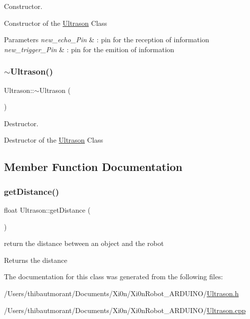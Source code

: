 Constructor. 

Constructor of the \hyperlink{class_ultrason}{Ultrason} Class\textquotesingle{}


\begin{DoxyParams}{Parameters}
{\em new\+\_\+echo\+\_\+\+Pin} & \+: pin for the reception of information \\
\hline
{\em new\+\_\+trigger\+\_\+\+Pin} & \+: pin for the emition of information \\
\hline
\end{DoxyParams}
\mbox{\label{class_ultrason_a9ddfaa75d2d63df4a35bfe2a62a87029}} 
\subsubsection{\texorpdfstring{$\sim$\+Ultrason()}{~Ultrason()}}
{\footnotesize\ttfamily Ultrason\+::$\sim$\+Ultrason (\begin{DoxyParamCaption}{ }\end{DoxyParamCaption})}



Destructor. 

Destructor of the \hyperlink{class_ultrason}{Ultrason} Class\textquotesingle{} 

\subsection{Member Function Documentation}
\mbox{\label{class_ultrason_ae0c4468df36bc49c31e5e8a4eb973e08}} 
\subsubsection{\texorpdfstring{get\+Distance()}{getDistance()}}
{\footnotesize\ttfamily float Ultrason\+::get\+Distance (\begin{DoxyParamCaption}{ }\end{DoxyParamCaption})}



return the distance between an object and the robot 

\begin{DoxyReturn}{Returns}
the distance 
\end{DoxyReturn}


The documentation for this class was generated from the following files\+:\begin{DoxyCompactItemize}
\item 
/\+Users/thibautmorant/\+Documents/\+Xi0n/\+Xi0n\+Robot\+\_\+\+A\+R\+D\+U\+I\+N\+O/\hyperlink{_ultrason_8h}{Ultrason.\+h}\item 
/\+Users/thibautmorant/\+Documents/\+Xi0n/\+Xi0n\+Robot\+\_\+\+A\+R\+D\+U\+I\+N\+O/\hyperlink{_ultrason_8cpp}{Ultrason.\+cpp}\end{DoxyCompactItemize}
